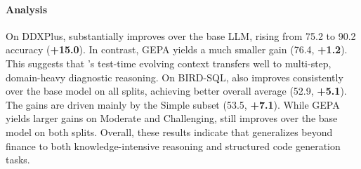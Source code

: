 \paragraph{Analysis} On DDXPlus, \name substantially improves over the base LLM, rising from 75.2 to 90.2 accuracy (\textbf{+15.0}). 
In contrast, GEPA yields a much smaller gain (76.4, \textbf{+1.2}). 
This suggests that \name's test-time evolving context transfers well to multi-step, domain-heavy diagnostic reasoning.
On BIRD-SQL, \name also improves consistently over the base model on all splits, achieving better overall average (52.9, \textbf{+5.1}). 
The gains are driven mainly by the Simple subset (53.5, \textbf{+7.1}).
While GEPA yields larger gains on Moderate and Challenging, \name still improves over the base model on both splits. 
Overall, these results indicate that \name generalizes beyond finance to both knowledge-intensive reasoning and structured code generation tasks.

\begin{table}[t!]
  \centering
  \caption{\textbf{Results on Medical Reasoning Benchmark (DeepSeek-V3.1-671B as the Base LLM).} We use DDXPlus from StreamBench.}
  \label{tab:ddxplus-streambench}
\end{table}



